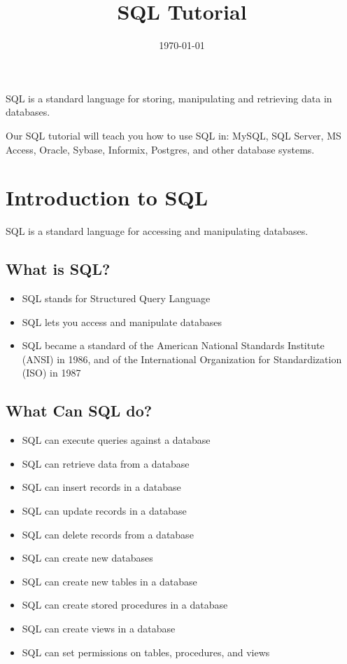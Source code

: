 \documentclass[a4paper,12pt]{article}
\begin{document}
\title{SQL Tutorial}
\date{\today}
\maketitle

\tableofcontents

\newpage

\lstset{style=mystyle}


SQL is a standard language for storing, manipulating and retrieving data in databases.

Our SQL tutorial will teach you how to use SQL in: MySQL, SQL Server, MS Access, Oracle, Sybase, Informix, Postgres, and other database systems.



\section{Introduction to SQL}

SQL is a standard language for accessing and manipulating databases.

\subsection{What is SQL?}

\begin{itemize}
	\item SQL stands for Structured Query Language
	\item SQL lets you access and manipulate databases
	\item SQL became a standard of the American National Standards Institute (ANSI) in 1986, and of the International Organization for Standardization (ISO) in 1987
\end{itemize}



\subsection{What Can SQL do?}

\begin{itemize}
	\item SQL can execute queries against a database
	\item SQL can retrieve data from a database
	\item SQL can insert records in a database
	\item SQL can update records in a database
	\item SQL can delete records from a database
	\item SQL can create new databases
	\item SQL can create new tables in a database
	\item SQL can create stored procedures in a database
	\item SQL can create views in a database
	\item SQL can set permissions on tables, procedures, and views
\end{itemize}
\end{document}
